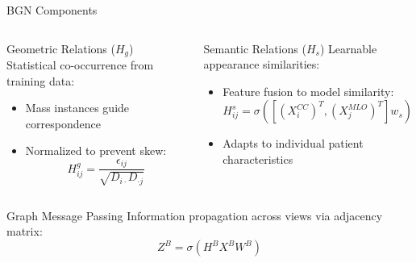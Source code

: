 \documentclass[8pt,aspectratio=169,xcolor=dvipsnames]{beamer}
\begin{document}
\begin{frame}{BGN Components}
    \begin{columns}
        \begin{block}{Geometric Relations ($H_g$)}
        Statistical co-occurrence from training data:
        \begin{itemize}
            \item Mass instances guide correspondence
            \item Normalized to prevent skew:
                $$H_{ij}^g = \frac{\epsilon_{ij}}{\sqrt{D_{i \cdot} D_{\cdot j}}}$$
        \end{itemize}
        \end{block}
        
        \begin{block}{Semantic Relations ($H_s$)}
        Learnable appearance similarities:
        \begin{itemize}
            \item Feature fusion to model similarity:
                $$H_{ij}^s = \sigma\left(\left[\left(X_i^{CC}\right)^T, \left(X_j^{MLO}\right)^T\right]w_s\right)$$
            \item Adapts to individual patient characteristics
        \end{itemize}
        \end{block}
    \end{columns}
    
    \begin{alertblock}{Graph Message Passing}
    Information propagation across views via adjacency matrix:
    $$ Z^B = \sigma(H^B X^B W^B) $$
    \end{alertblock}
\end{frame}
\end{document}
